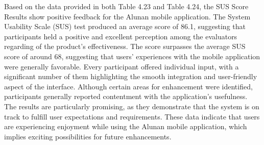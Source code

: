 \begin{enumerate}[A.]
    Based on the data provided in both Table 4.23 and Table 4.24, the SUS Score Results show positive feedback for the Alunan mobile application. The System Usability Scale (SUS) test produced an average score of 86.1, suggesting that participants held a positive and excellent perception among the evaluators regarding of the product's effectiveness. The score surpasses the average SUS score of around 68, suggesting that users' experiences with the mobile application were generally favorable. Every participant offered individual input, with a significant number of them highlighting the smooth integration and user-friendly aspect of the interface. Although certain areas for enhancement were identified, participants generally reported contentment with the application's usefulness. The results are particularly promising, as they demonstrate that the system is on track to fulfill user expectations and requirements. These data indicate that users are experiencing enjoyment while using the Alunan mobile application, which implies exciting possibilities for future enhancements.
\end{enumerate}